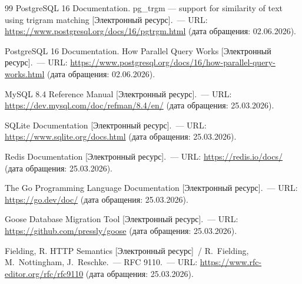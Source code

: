 \begin{thebibliography}{99}
 PostgreSQL 16 Documentation. pg\_trgm --- support for similarity of text using trigram matching [Электронный ресурс].~--- URL: \url{https://www.postgresql.org/docs/16/pgtrgm.html} (дата обращения: 02.06.2026).

 PostgreSQL 16 Documentation. How Parallel Query Works [Электронный ресурс].~--- URL: \url{https://www.postgresql.org/docs/16/how-parallel-query-works.html} (дата обращения: 02.06.2026).

 MySQL 8.4 Reference Manual [Электронный ресурс].~--- URL: \url{https://dev.mysql.com/doc/refman/8.4/en/} (дата обращения: 25.03.2026).

 SQLite Documentation [Электронный ресурс].~--- URL: \url{https://www.sqlite.org/docs.html} (дата обращения: 25.03.2026).

 Redis Documentation [Электронный ресурс].~--- URL: \url{https://redis.io/docs/} (дата обращения: 25.03.2026).

 The Go Programming Language Documentation [Электронный ресурс].~--- URL: \url{https://go.dev/doc/} (дата обращения: 25.03.2026).

 Goose Database Migration Tool [Электронный ресурс].~--- URL: \url{https://github.com/pressly/goose} (дата обращения: 25.03.2026).

 Fielding, R. HTTP Semantics [Электронный ресурс]~/ R.~Fielding, M.~Nottingham, J.~Reschke.~--- RFC 9110.~--- URL: \url{https://www.rfc-editor.org/rfc/rfc9110} (дата обращения: 25.03.2026).

\end{thebibliography}

